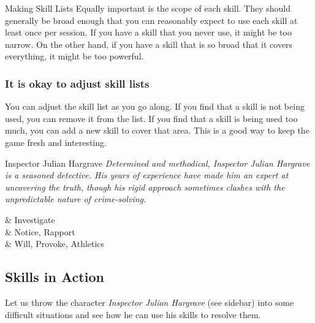 \begin{multicols}{2}
\begin{WyrdSidebar}{Making Skill Lists}
		Equally important is the scope of each skill. They should generally be broad enough that you can reasonably expect to use each skill at least once per session. If you have a skill that you never use, it might be too narrow. On the other hand, if you have a skill that is so broad that it covers everything, it might be too powerful.

		\subsubsection*{It is okay to adjust skill lists}
		You can adjust the skill list as you go along. If you find that a skill is not being used, you can remove it from the list. If you find that a skill is being used too much, you can add a new skill to cover that area. This is a good way to keep the game fresh and interesting.
	\end{WyrdSidebar}

	\begin{WyrdNPC}{Inspector Julian Hargrave}
		\emph{Determined and methodical, Inspector Julian Hargrave is a seasoned detective. His years of experience have made him an expert at uncovering the truth, though his rigid approach sometimes clashes with the unpredictable nature of crime-solving.}

		\vspace{0.5\baselineskip}
		\begin{SkillsBox}
			\Expert & Investigate \\
			\Skilled & Notice, Rapport \\
			\Novice & Will, Provoke, Athletics \\
		\end{SkillsBox}
	\end{WyrdNPC}


	\end{multicols}

\EndBoxPage

\subsection{Skills in Action}

Let us throw the character \emph{Inspector Julian Hargrave} (see sidebar) into some difficult situations and see how he can use his skills to resolve them.

